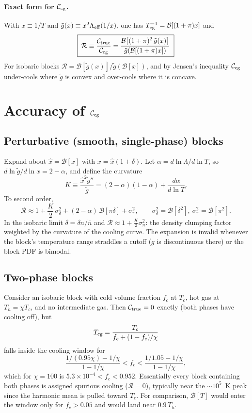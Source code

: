 \documentclass[11pt]{article}
\newcommand{\B}{\mathcal{B}}
\newcommand{\Leff}{\Lambda_{\rm eff}}
\newcommand{\Ctrue}{\mathcal{C}_{\rm true}}
\newcommand{\Ccg}{\mathcal{C}_{\rm cg}}
\newcommand{\Tcg}{T_{\rm cg}}
\begin{document}
\paragraph{Exact form for $\Ccg$.} With $x\equiv1/T$ and $\tilde g(x)\equiv x^2\Leff(1/x)$, one has $\Tcg^{-1}=\B[(1+\pi)x]$ and
\begin{equation}
\boxed{\;\mathcal R\equiv\frac{\Ctrue}{\Ccg}=\frac{\B\!\left[(1+\pi)^2\,\tilde g(x)\right]}{\tilde g\!\left(\B[(1+\pi)x]\right)}\;}
\end{equation}
For isobaric blocks $\mathcal R=\B[\tilde g(x)]/\tilde g(\B[x])$, and by Jensen's inequality $\Ccg$ under-cools where $\tilde g$ is convex and over-cools where it is concave.

\section{Accuracy of $\Ccg$}

\subsection{Perturbative (smooth, single-phase) blocks}
Expand about $\hat x=\B[x]$ with $x=\hat x(1+\delta)$. Let $\alpha=d\ln\Lambda/d\ln T$, so $d\ln\tilde g/d\ln x=2-\alpha$, and define the curvature
\begin{equation}
K\equiv\frac{\hat x^2\tilde g''}{\tilde g}=(2-\alpha)(1-\alpha)+\frac{d\alpha}{d\ln T}.
\end{equation}
To second order,
\begin{equation}
\mathcal R\approx1+\frac{K}{2}\,\sigma_\delta^2+(2-\alpha)\,\B[\pi\delta]+\sigma_\pi^2,
\qquad \sigma_\delta^2=\B[\delta^2],\ \sigma_\pi^2=\B[\pi^2].
\end{equation}
In the isobaric limit $\delta=\delta n/\bar n$ and $\mathcal R\approx1+\tfrac K2\sigma_n^2$: the density clumping factor weighted by the curvature of the cooling curve. The expansion is invalid whenever the block's temperature range straddles a cutoff ($g$ is discontinuous there) or the block PDF is bimodal.

\subsection{Two-phase blocks}
Consider an isobaric block with cold volume fraction $f_c$ at $T_c$, hot gas at $T_h=\chi T_c$, and no intermediate gas. Then $\Ctrue=0$ exactly (both phases have cooling off), but
\begin{equation}
\Tcg=\frac{T_c}{f_c+(1-f_c)/\chi}
\end{equation}
falls inside the cooling window for
\begin{equation}
\frac{1/(0.95\chi)-1/\chi}{1-1/\chi}<f_c<\frac{1/1.05-1/\chi}{1-1/\chi},
\end{equation}
which for $\chi=100$ is $5.3\times10^{-4}<f_c<0.952$. Essentially every block containing both phases is assigned spurious cooling ($\mathcal R=0$), typically near the $\sim10^5$~K peak since the harmonic mean is pulled toward $T_c$. For comparison, $\B[T]$ would enter the window only for $f_c>0.05$ and would land near $0.9\,T_h$.
\end{document}
